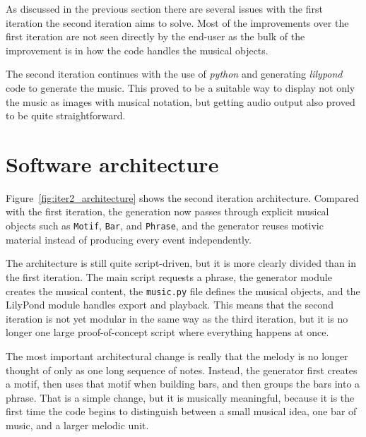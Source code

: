 As discussed in the previous section there are several issues with the first iteration the second iteration aims to solve. Most of the improvements over the first iteration are not seen directly by the end-user as the bulk of the improvement is in how the code handles the musical objects.

The second iteration continues with the use of \textit{python} and generating \textit{lilypond} code to generate the music. This proved to be a suitable way to display not only the music as images with musical notation, but getting audio output also proved to be quite straightforward.

\section{Software architecture}
Figure~\ref{fig:iter2_architecture} shows the second iteration architecture. Compared with the first iteration, the generation now passes through explicit musical objects such as \texttt{Motif}, \texttt{Bar}, and \texttt{Phrase}, and the generator reuses motivic material instead of producing every event independently.

The architecture is still quite script-driven, but it is more clearly divided than in the first iteration. The main script requests a phrase, the generator module creates the musical content, the \texttt{music.py} file defines the musical objects, and the LilyPond module handles export and playback. This means that the second iteration is not yet modular in the same way as the third iteration, but it is no longer one large proof-of-concept script where everything happens at once.

The most important architectural change is really that the melody is no longer thought of only as one long sequence of notes. Instead, the generator first creates a motif, then uses that motif when building bars, and then groups the bars into a phrase. That is a simple change, but it is musically meaningful, because it is the first time the code begins to distinguish between a small musical idea, one bar of music, and a larger melodic unit.

